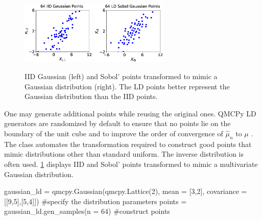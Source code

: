 \documentclass[11pt]{NSFamsart}
\newcommand{\hmu}{\hat{\mu}}
\begin{document}
\begin{figure}
	\centering
	\includegraphics[height = 3.0cm]{ProgramsImages/Gauss_IID.eps}
	\includegraphics[height = 3.0cm]{ProgramsImages/Gauss_Sobol.eps}
	\caption{IID Gaussian (left) and Sobol'  points transformed to mimic a Gaussian distribution (right).  The LD points better represent the Gaussian distribution than the IID points. \label{fig:ld_Gauss}}
	\vspace{-0.3cm}
\end{figure}

One may generate additional points while reusing the original ones.   QMCPy LD generators are randomized by default to ensure that no points lie on the boundary of the unit cube and to improve the order of convergence of $\hmu_n$ to $\mu$ \cite{Owe97}. The  class automates the transformation required to construct good points that mimic distributions other than standard uniform.  The  inverse  distribution is often used.  \cref{fig:ld_Gauss} displays  IID and Sobol' points  transformed to mimic a multivariate  Gaussian distribution.
\begin{pythoncode}
gaussian_ld = qmcpy.Gaussian(qmcpy.Lattice(2), mean = [3,2], covariance = [[9,5],[5,4]])  #specify the distribution parameters
points = gaussian_ld.gen_samples(n = 64)  #construct points
\end{pythoncode}

\end{document}
